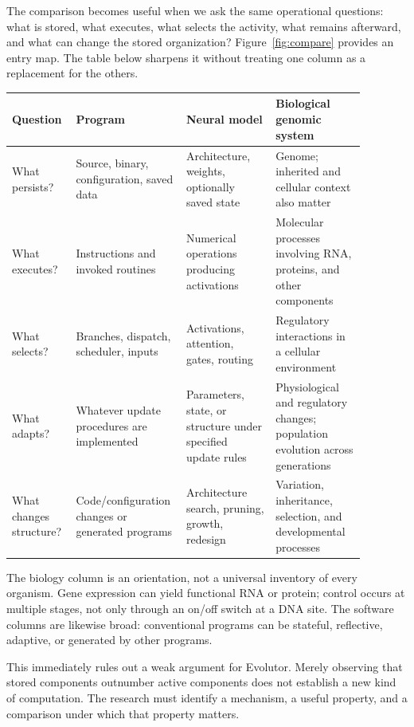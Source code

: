 The comparison becomes useful when we ask the same operational questions: what is stored, what executes, what selects the activity, what remains afterward, and what can change the stored organization? Figure~\ref{fig:compare} provides an entry map. The table below sharpens it without treating one column as a replacement for the others.
\begin{minipage}{\linewidth}\small
\begin{tabular}{P{0.16\linewidth}P{0.24\linewidth}P{0.24\linewidth}P{0.24\linewidth}}
\toprule Question & Program & Neural model & Biological genomic system\\\midrule
What persists? & Source, binary, configuration, saved data & Architecture, weights, optionally saved state & Genome; inherited and cellular context also matter\\
What executes? & Instructions and invoked routines & Numerical operations producing activations & Molecular processes involving RNA, proteins, and other components\\
What selects? & Branches, dispatch, scheduler, inputs & Activations, attention, gates, routing & Regulatory interactions in a cellular environment\\
What adapts? & Whatever update procedures are implemented & Parameters, state, or structure under specified update rules & Physiological and regulatory changes; population evolution across generations\\
What changes structure? & Code/configuration changes or generated programs & Architecture search, pruning, growth, redesign & Variation, inheritance, selection, and developmental processes\\
\bottomrule
\end{tabular}
\end{minipage}
The biology column is an orientation, not a universal inventory of every organism. Gene expression can yield functional RNA or protein; control occurs at multiple stages, not only through an on/off switch at a DNA site.\cite{expression,control} The software columns are likewise broad: conventional programs can be stateful, reflective, adaptive, or generated by other programs.

This immediately rules out a weak argument for Evolutor. Merely observing that stored components outnumber active components does not establish a new kind of computation. The research must identify a mechanism, a useful property, and a comparison under which that property matters.

